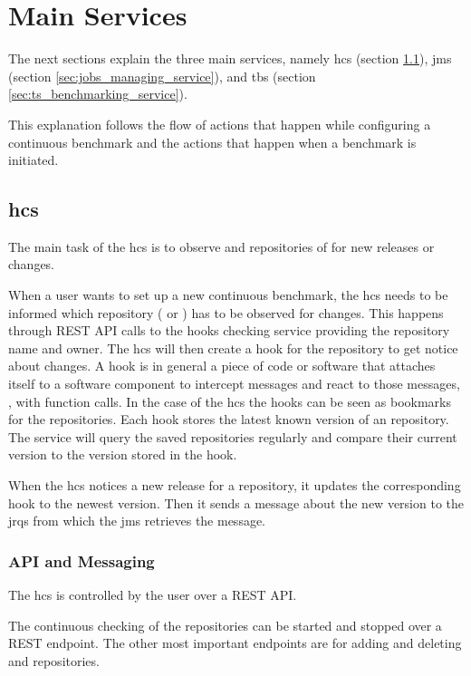 \section{Main Services}
\label{sec:main_services}
The next sections explain the three main services, namely \acl{hcs} (section \ref{sec:hooks_checking_service}), \acl{jms} (section \ref{sec:jobs_managing_service}), and \acl{tbs} (section \ref{sec:ts_benchmarking_service}).

This explanation follows the flow of actions that happen while configuring a continuous benchmark and the actions that happen when a benchmark is initiated.


\subsection{\acl{hcs}}
\label{sec:hooks_checking_service}
The main task of the \ac{hcs} is to observe \gh{} and \dockh{} repositories of \tsp{} for new releases or changes.

When a user wants to set up a new continuous benchmark, the \ac{hcs} needs to be informed which repository (\gh{} or \dockh{}) has to be observed for changes.
This happens through REST API calls to the hooks checking service providing the repository name and owner.
The \ac{hcs} will then create a hook for the repository to get notice about changes.
A hook is in general a piece of code or software that attaches itself to a software component to intercept messages and react to those messages, \eg, with function calls.
In the case of the \ac{hcs} the hooks can be seen as bookmarks for the repositories.
Each hook stores the latest known version of an repository.
The service will query the saved repositories regularly and compare their current version to the version stored in the hook.

When the \ac{hcs} notices a new release for a repository, it updates the corresponding hook to the newest version.
Then it sends a message about the new version to the \aclp{jrq} from which the \acl{jms} retrieves the message.

\subsubsection{API and Messaging}
\label{sec:hooks_api}
The \ac{hcs} is controlled by the user over a REST API.

The continuous checking of the repositories can be started and stopped over a REST endpoint.
The other most important endpoints are for adding and deleting \gh{} and \dockh{} repositories.
\\

